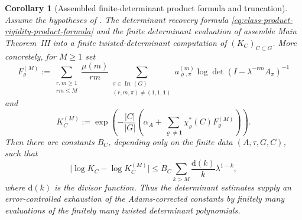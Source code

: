 \documentclass[11pt,a4paper]{amsart}
\theoremstyle{plain}
\newtheorem{corollary}[theorem]{Corollary}
\theoremstyle{definition}
\theoremstyle{remark}
\DeclareMathOperator{\Irr}{Irr}
\newcommand{\abs}[1]{\lvert #1 \rvert}
\begin{document}
\begin{corollary}[Assembled finite-determinant product formula and truncation]
  \label{cor:assembled-adams-frobenius-product-formula}
  \label{cor:assembled-adams-frobenius-product-package}
  Assume the hypotheses of .  The determinant
  recovery formula \eqref{eq:class-product-rigidity-product-formula} and the
  finite determinant evaluation of
   assemble Main Theorem~III into a
  finite twisted-determinant computation of \((K_C)_{C\subset G}\).  More
  concretely, for
  \(M\ge1\) set
  \begin{equation}\label{eq:class-product-finite-truncation-coordinate}
    F^{(M)}_\varrho
    :=
    \sum_{\substack{r,m\ge1\\rm\le M}}
      \frac{\mu(m)}{rm}
      \sum_{\substack{\pi\in\Irr(G)\\(r,m,\pi)\neq(1,1,\mathbf1)}}
        a_{\varrho,\pi}^{(m)}
        \log\det(I-\lambda^{-rm}A_\pi)^{-1}
  \end{equation}
  and
  \begin{equation}\label{eq:class-product-finite-truncation-constant}
    K_C^{(M)}
    :=
    \exp\!\left(
      -\frac{|C|}{|G|}
      \left(
        \alpha_A+
        \sum_{\varrho\ne\mathbf1}\chi_\varrho^\ast(C)F^{(M)}_\varrho
      \right)
    \right).
  \end{equation}
  Then there are constants \(B_C\), depending only on the finite data
  \((A,\tau,G,C)\), such that
  \begin{equation}\label{eq:class-product-finite-truncation-error}
    \abs{\log K_C-\log K_C^{(M)}}
    \le
    B_C
    \sum_{k>M}\frac{\mathrm d(k)}{k}\lambda^{1-k},
  \end{equation}
  where \(\mathrm d(k)\) is the divisor function.  Thus the determinant
  estimates supply an error-controlled exhaustion of the Adams-corrected
  constants by finitely many evaluations of the finitely many twisted
  determinant polynomials.
\end{corollary}
\end{document}
